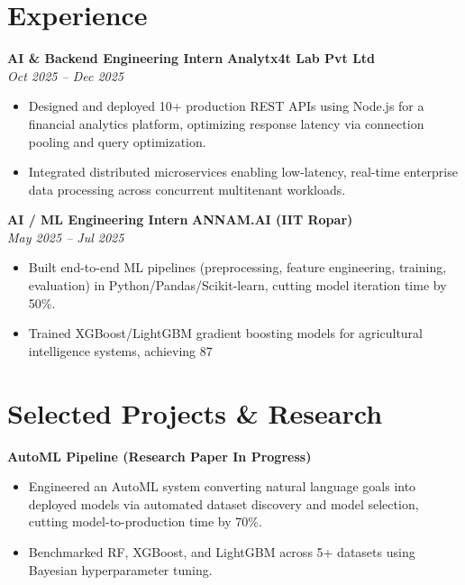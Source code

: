 \documentclass[10pt, letterpaper]{article}
\begin{document}
\section*{Experience}

\textbf{AI & Backend Engineering Intern} \hfill \textbf{Analytx4t Lab Pvt Ltd} \\
\textit{Oct 2025 – Dec 2025}
\begin{itemize}[leftmargin=*, itemsep=2pt]
    \item Designed and deployed 10+ production REST APIs using Node.js for a financial analytics platform, optimizing response latency via connection pooling and query optimization.
    \item Integrated distributed microservices enabling low-latency, real-time enterprise data processing across concurrent multitenant workloads.
\end{itemize}

\vspace{4pt}

\textbf{AI / ML Engineering Intern} \hfill \textbf{ANNAM.AI (IIT Ropar)} \\
\textit{May 2025 – Jul 2025}
\begin{itemize}[leftmargin=*, itemsep=2pt]
    \item Built end-to-end ML pipelines (preprocessing, feature engineering, training, evaluation) in Python/Pandas/Scikit-learn, cutting model iteration time by 50\%.
    \item Trained XGBoost/LightGBM gradient boosting models for agricultural intelligence systems, achieving 87%
\end{itemize}

\section*{Selected Projects & Research}

\textbf{AutoML Pipeline (Research Paper In Progress)}
\begin{itemize}[leftmargin=*, itemsep=1pt]
    \item Engineered an AutoML system converting natural language goals into deployed models via automated dataset discovery and model selection, cutting model-to-production time by 70\%.
    \item Benchmarked RF, XGBoost, and LightGBM across 5+ datasets using Bayesian hyperparameter tuning.
\end{itemize}
\end{document}
